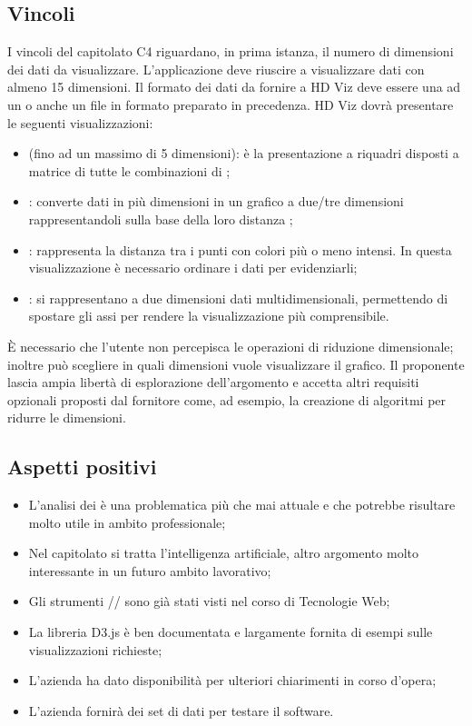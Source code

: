 \subsection{Vincoli}
I vincoli del capitolato C4 riguardano, in prima istanza, il numero di dimensioni dei dati da visualizzare. L'applicazione deve riuscire a visualizzare dati con almeno 15 dimensioni. 
Il formato dei dati da fornire a HD Viz deve essere una  ad un  o anche un file in formato  preparato in precedenza.
HD Viz dovrà presentare le seguenti visualizzazioni: 
\begin{itemize}
\item \textbf{} (fino ad un massimo di 5 dimensioni): è la presentazione a riquadri disposti a matrice di tutte le combinazioni di ; 
\item \textbf{}: converte dati in più dimensioni in un grafico a due/tre dimensioni rappresentandoli sulla base della loro distanza ; 
\item \textbf{}: rappresenta la distanza tra i punti con colori più o meno intensi. In questa visualizzazione è necessario ordinare i dati per evidenziarli; 
\item \textbf{}: si rappresentano a due dimensioni dati multidimensionali, permettendo di spostare gli assi per rendere la visualizzazione più comprensibile.  
\end{itemize} 
È necessario che l'utente non percepisca le operazioni di riduzione dimensionale; inoltre può scegliere in quali dimensioni vuole visualizzare il grafico.
Il proponente lascia ampia libertà di esplorazione dell'argomento e accetta altri requisiti opzionali proposti dal fornitore come, ad esempio, la creazione di algoritmi per ridurre le dimensioni.

\subsection{Aspetti positivi}
\begin{itemize}
\item L'analisi dei  è una problematica più che mai attuale e che potrebbe risultare molto utile in ambito professionale;
\item Nel capitolato si tratta l'intelligenza artificiale, altro argomento molto interessante in un futuro ambito lavorativo;
\item Gli strumenti // sono già stati visti nel corso di Tecnologie Web;
\item La libreria D3.js è ben documentata e largamente fornita di esempi sulle visualizzazioni richieste;
\item L'azienda ha dato disponibilità per ulteriori chiarimenti in corso d'opera;
\item L'azienda fornirà dei set di dati per testare il software.
\end{itemize}

